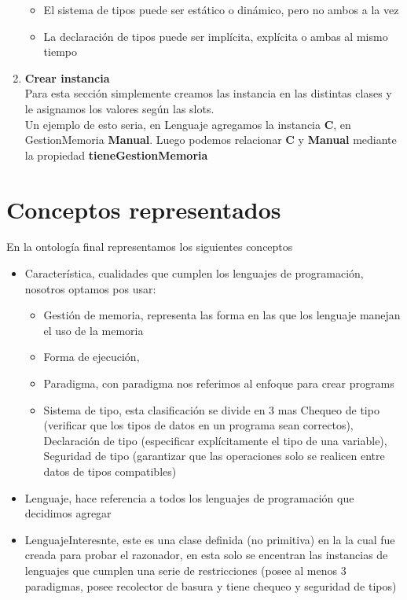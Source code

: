 \documentclass[12pt, titlepage, a4paper]{article}
\begin{document}
\begin{enumerate}
{\begin{itemize}
{                ambos a la vez}
            \item {El sistema de tipos puede ser estático o dinámico, pero no
                ambos a la vez}
            \item {La declaración de tipos puede ser implícita, explícita o ambas al mismo tiempo}
          \end{itemize}
          }
    \item {\textbf{Crear instancia}\\
         Para esta sección simplemente creamos las instancia en las 
         distintas clases y le asignamos los valores según las slots.\\ 
         Un ejemplo de esto seria, en Lenguaje agregamos la 
         instancia \textbf{C}, en GestionMemoria \textbf{Manual}. 
         Luego podemos relacionar \textbf{C} y \textbf{Manual} mediante la 
         propiedad \textbf{tieneGestionMemoria}}
\end{enumerate}

\section{Conceptos representados}
En la ontología final representamos los siguientes conceptos
\begin{itemize}
    \item {Característica, cualidades que cumplen los lenguajes de programación, 
        nosotros optamos pos usar:
        \begin{itemize}
            \item {Gestión de memoria, representa las forma en las que los 
                lenguaje manejan el uso de la memoria}
            \item {Forma de ejecución, }
            \item {Paradigma, con paradigma nos referimos al
                enfoque para crear programs}
            \item {Sistema de tipo, esta clasificación se divide en 3 mas
                Chequeo de tipo (verificar que los tipos de datos 
                en un programa sean correctos), Declaración de tipo 
                (especificar explícitamente el tipo de una variable), 
                Seguridad de tipo (garantizar que las operaciones solo 
                se realicen entre datos de tipos compatibles)}
        \end{itemize}}
    \item {Lenguaje, hace referencia a todos los lenguajes de programación 
        que decidimos agregar}
    \item {LenguajeInteresnte, este es una clase definida (no primitiva) en la 
            la cual fue creada para probar el razonador, en esta solo se encentran 
            las instancias de lenguajes que cumplen una serie de restricciones 
            (posee al menos 3 paradigmas, posee recolector de basura y tiene 
            chequeo y seguridad de tipos)}
\end{itemize}
\end{document}

